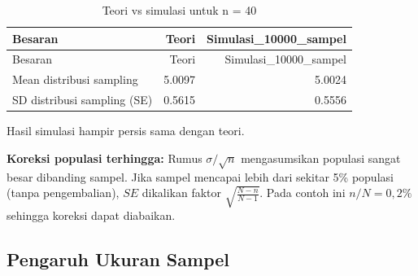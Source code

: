 \documentclass[
  indonesian,
  letterpaper,
]{book}
\begin{document}
\begin{longtable}[]{@{}lrr@{}}
\caption{Teori vs simulasi untuk n = 40}\tabularnewline
\toprule\noalign{}
Besaran & Teori & Simulasi\_10000\_sampel \\
\midrule\noalign{}
\endfirsthead
\toprule\noalign{}
Besaran & Teori & Simulasi\_10000\_sampel \\
\midrule\noalign{}
\endhead
\bottomrule\noalign{}
\endlastfoot
Mean distribusi sampling & 5.0097 & 5.0024 \\
SD distribusi sampling (SE) & 0.5615 & 0.5556 \\
\end{longtable}

Hasil simulasi hampir persis sama dengan teori.

\textbf{Koreksi populasi terhingga:} Rumus \(\sigma / \sqrt{n}\)
mengasumsikan populasi sangat besar dibanding sampel. Jika sampel
mencapai lebih dari sekitar 5\% populasi (tanpa pengembalian), \(SE\)
dikalikan faktor \(\sqrt{\frac{N - n}{N - 1}}\). Pada contoh ini
\(n/N = 0{,}2\%\) sehingga koreksi dapat diabaikan.

\subsection{Pengaruh Ukuran Sampel}\label{pengaruh-ukuran-sampel}
\end{document}
